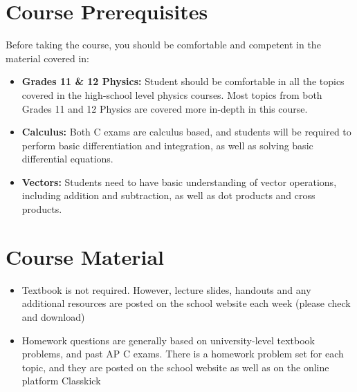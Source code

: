 \documentclass{../../oss-handout}
\begin{document}
\section*{Course Prerequisites}
Before taking the course, you should be comfortable and competent in the
material covered in:
\begin{itemize}[nosep,leftmargin=15pt]
\item\textbf{Grades 11 \& 12 Physics:} Student should be comfortable in all the
  topics covered in the high-school level physics courses. Most topics from
  both Grades 11 and 12 Physics are covered more in-depth in this course.
\item\textbf{Calculus:} Both C exams are calculus based, and students will be
  required to perform basic differentiation and integration, as well as solving
  basic differential equations.
\item\textbf{Vectors:} Students need to have basic understanding of vector
  operations, including addition and subtraction, as well as dot products and
  cross products.
\end{itemize}


\section*{Course Material}
\begin{itemize}[nosep,leftmargin=15pt]
\item Textbook is not required. However, lecture slides, handouts and any
  additional resources are posted on the school website each week (please check
  and download)
\item Homework questions are generally based on university-level textbook
  problems, and past AP C exams. There is a homework problem set for each
  topic, and they are posted on the school website as well as on the online
  platform Classkick
\end{itemize}
\end{document}
